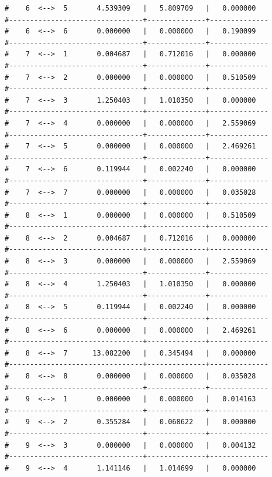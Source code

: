 \begin{enumerate}
{\begin{verbatim}
#    6  <-->  5       4.539309   |   5.809709   |   0.000000   
#--------------------------------+--------------+--------------
#    6  <-->  6       0.000000   |   0.000000   |   0.190099   
#--------------------------------+--------------+--------------
#    7  <-->  1       0.004687   |   0.712016   |   0.000000   
#--------------------------------+--------------+--------------
#    7  <-->  2       0.000000   |   0.000000   |   0.510509   
#--------------------------------+--------------+--------------
#    7  <-->  3       1.250403   |   1.010350   |   0.000000   
#--------------------------------+--------------+--------------
#    7  <-->  4       0.000000   |   0.000000   |   2.559069   
#--------------------------------+--------------+--------------
#    7  <-->  5       0.000000   |   0.000000   |   2.469261   
#--------------------------------+--------------+--------------
#    7  <-->  6       0.119944   |   0.002240   |   0.000000   
#--------------------------------+--------------+--------------
#    7  <-->  7       0.000000   |   0.000000   |   0.035028   
#--------------------------------+--------------+--------------
#    8  <-->  1       0.000000   |   0.000000   |   0.510509   
#--------------------------------+--------------+--------------
#    8  <-->  2       0.004687   |   0.712016   |   0.000000   
#--------------------------------+--------------+--------------
#    8  <-->  3       0.000000   |   0.000000   |   2.559069   
#--------------------------------+--------------+--------------
#    8  <-->  4       1.250403   |   1.010350   |   0.000000   
#--------------------------------+--------------+--------------
#    8  <-->  5       0.119944   |   0.002240   |   0.000000   
#--------------------------------+--------------+--------------
#    8  <-->  6       0.000000   |   0.000000   |   2.469261   
#--------------------------------+--------------+--------------
#    8  <-->  7      13.082200   |   0.345494   |   0.000000   
#--------------------------------+--------------+--------------
#    8  <-->  8       0.000000   |   0.000000   |   0.035028   
#--------------------------------+--------------+--------------
#    9  <-->  1       0.000000   |   0.000000   |   0.014163   
#--------------------------------+--------------+--------------
#    9  <-->  2       0.355284   |   0.068622   |   0.000000   
#--------------------------------+--------------+--------------
#    9  <-->  3       0.000000   |   0.000000   |   0.004132   
#--------------------------------+--------------+--------------
#    9  <-->  4       1.141146   |   1.014699   |   0.000000   

\end{verbatim}}
\end{enumerate}
